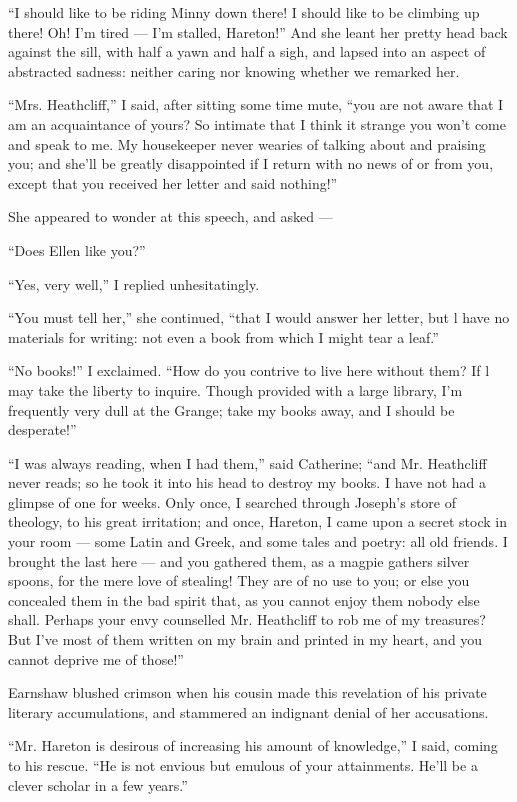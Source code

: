 \par “I should like to be riding Minny down there! I should like to be climbing up there! Oh! I'm tired — I'm stalled, Hareton!” And she leant her pretty head back against the sill, with half a yawn and half a sigh, and lapsed into an aspect of abstracted sadness: neither caring nor knowing whether we remarked her.
\par “Mrs. Heathcliff,” I said, after sitting some time mute, “you are not aware that I am an acquaintance of yours? So intimate that I think it strange you won't come and speak to me. My housekeeper never wearies of talking about and praising you; and she'll be greatly disappointed if I return with no news of or from you, except that you received her letter and said nothing!”
\par She appeared to wonder at this speech, and asked —
\par “Does Ellen like you?”
\par “Yes, very well,” I replied unhesitatingly.
\par “You must tell her,” she continued, “that I would answer her letter, but l have no materials for writing: not even a book from which I might tear a leaf.”
\par “No books!” I exclaimed. “How do you contrive to live here without them? If l may take the liberty to inquire. Though provided with a large library, I'm frequently very dull at the Grange; take my books away, and I should be desperate!”
\par “I was always reading, when I had them,” said Catherine; “and Mr. Heathcliff never reads; so he took it into his head to destroy my books. I have not had a glimpse of one for weeks. Only once, I searched through Joseph's store of theology, to his great irritation; and once, Hareton, I came upon a secret stock in your room — some Latin and Greek, and some tales and poetry: all old friends. I brought the last here — and you gathered them, as a magpie gathers silver spoons, for the mere love of stealing! They are of no use to you; or else you concealed them in the bad spirit that, as you cannot enjoy them nobody else shall. Perhaps your envy counselled Mr. Heathcliff to rob me of my treasures? But I've most of them written on my brain and printed in my heart, and you cannot deprive me of those!”
\par Earnshaw blushed crimson when his cousin made this revelation of his private literary accumulations, and stammered an indignant denial of her accusations.
\par “Mr. Hareton is desirous of increasing his amount of knowledge,” I said, coming to his rescue. “He is not envious but emulous of your attainments. He'll be a clever scholar in a few years.”
